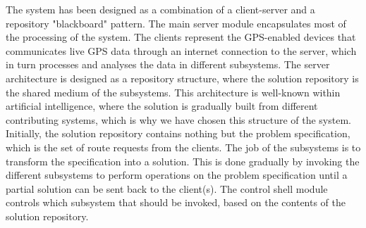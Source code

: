 The system has been designed as a combination of a client-server and a repository "blackboard" pattern. The main server module encapsulates most of the processing of the system. The clients represent the GPS-enabled devices that communicates live GPS data through an internet connection to the server, which in turn processes and analyses the data in different subsystems. The server architecture is designed as a repository structure, where the solution repository is the shared medium of the subsystems. This architecture is well-known within artificial intelligence, where the solution is gradually built from different contributing systems, which is why we have chosen this structure of the system. Initially, the solution repository contains nothing but the problem specification, which is the set of route requests from the clients. The job of the subsystems is to transform the specification into a solution. This is done gradually by invoking the different subsystems to perform operations on the problem specification until a partial solution can be sent back to the client(s). The control shell module controls which subsystem that should be invoked, based on the contents of the solution repository. 

